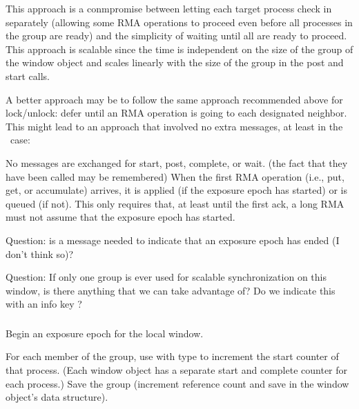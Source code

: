 \documentclass{article}
\begin{document}
This approach is a conmpromise between letting each target process check in
separately (allowing some RMA operations to proceed even before all processes
in the group are ready) and the simplicity of waiting until all are ready to
proceed.  This approach is scalable since the time is independent on the size
of the group of the window object and scales linearly with the size of the
group in the post and start calls.  

A better approach may be to follow the same approach recommended above for
lock/unlock: defer until an RMA operation is going to each designated
neighbor. This might lead to an approach that involved no extra messages, at
least in the \tcpname\ case:
\begin{tcp}
No messages are exchanged for start, post, complete, or wait.
(the fact that they have been called may be remembered)
When the first RMA operation (i.e., put, get, or accumulate) arrives, it is 
applied (if the exposure epoch has started) or is queued (if not).  This only
requires that, at least until the first ack, a long RMA must not assume that
the exposure epoch has started.

Question: is a message needed to indicate that an exposure epoch has ended (I
don't think so)?
\end{tcp} 

Question: If only one group is ever used for scalable synchronization on this
window, is there anything that we can take advantage of?  Do we indicate this
with an info key ?

\subsubsection{}
Begin an exposure epoch for the local window.

For each member of the group, use  with type
 to increment the start counter of that
process.  (Each window object has a separate start and complete counter for
each process.)
Save the group (increment reference count and save in the window object's data structure).

\end{document}
